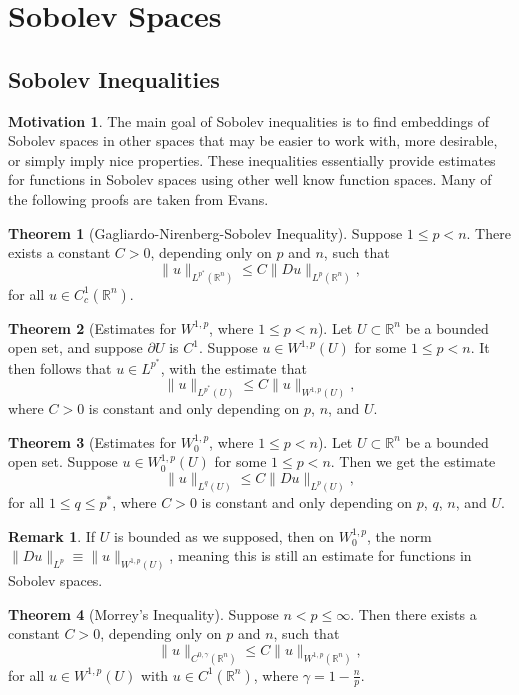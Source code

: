 \documentclass[11pt]{article}
\theoremstyle{definition}
\newtheorem*{theorem}{Theorem}
\newtheorem*{remark}{Remark}
\newtheorem*{motivation}{Motivation}
\begin{document}
\newpage

\section{Sobolev Spaces}
\subsection{Sobolev Inequalities}
\begin{motivation}
The main goal of Sobolev inequalities is to find embeddings of Sobolev spaces in other spaces that may be easier to work with, more desirable,
or simply imply nice properties. These inequalities essentially provide estimates for functions in Sobolev spaces using other
well know function spaces. Many of the following proofs are taken from Evans.
\end{motivation}
\begin{theorem}[Gagliardo-Nirenberg-Sobolev Inequality]
Suppose $1\leq p < n$. There exists a constant $C > 0$, depending only on $p$ and $n$, such that
	\[\|u\|_{L^{p^*}(\mathbb{R}^n)} \leq C\|Du\|_{L^{p}(\mathbb{R}^n)},\]
for all $u \in C_{c}^{1}(\mathbb{R}^n)$.
\end{theorem}

\begin{theorem}[Estimates for $W^{1,p}$, where $1 \leq p < n$]
Let $U \subset \mathbb{R}^n$ be a bounded open set, and suppose $\partial U$ is $C^1$.
Suppose $u \in W^{1,p}(U)$ for some $1 \leq p < n$. It then follows that $u \in L^{p^*}$, with the estimate that
	\[\|u\|_{L^{p^*}(U)} \leq C\|u\|_{W^{1,p}(U)},\]
where $C > 0$ is constant and only depending on $p$, $n$, and $U$.
\end{theorem}

\begin{theorem}[Estimates for $W_{0}^{1,p}$, where $1 \leq p < n$]
Let $U \subset \mathbb{R}^n$ be a bounded open set.
	Suppose $u \in W_{0}^{1,p}(U)$ for some $1 \leq p < n$. Then we get the estimate
	\[\|u\|_{L^{q}(U)} \leq C\|Du\|_{L^{p}(U)},\]
for all $1 \leq q \leq p^*$, where $C > 0$ is constant and only depending on $p$, $q$, $n$, and $U$.
\end{theorem}
\begin{remark}
If $U$ is bounded as we supposed, then on $W_{0}^{1,p}$, the norm $\|Du\|_{L^{p}} \equiv \|u\|_{W^{1,p}(U)}$,
meaning this is still an estimate for functions in Sobolev spaces.
\end{remark}

\begin{theorem}[Morrey's Inequality]
Suppose $n < p \leq \infty$. Then there exists a constant $C > 0$, depending only on $p$ and $n$, such that
	\[\|u\|_{C^{0,\gamma}(\mathbb{R}^n)} \leq C\|u\|_{W^{1,p}(\mathbb{R}^n)},\]
for all $u \in W^{1,p}(U)$ with $u \in C^1(\mathbb{R}^n)$, where $\gamma = 1 - \frac{n}{p}$.
\end{theorem}
\end{document}
